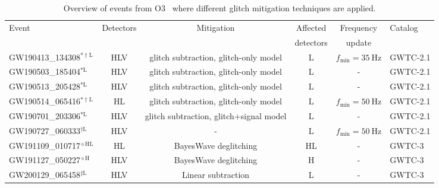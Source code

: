 \begin{table}[ht]
    \caption{
        Overview of events from O3~\citep{ligo_gwtc-21:2024, ligo_gwtc-3:2023} where different glitch mitigation techniques are applied.
    }
    \label{table:glitch_mitigation}
    \centering
    \setlength{\tabcolsep}{6pt}
    \begin{tabularx}{0.97\textwidth}{lccccl}
        \toprule
        \multirow{2}{*}{Event} & \multirow{2}{*}{Detectors} & \multirow{2}{*}{Mitigation} & Affected & Frequency & \multirow{2}{*}{Catalog} \\ 
         & & & detectors & update & \\ \midrule GW190413\_134308$^{*\dagger\mathrm{L}}$ & HLV & glitch subtraction, glitch-only model & L & $f_\mathrm{min} = \SI{35}{\hertz}$ & GWTC-2.1 \\
         GW190503\_185404$^{*\mathrm{L}}$ & HLV & glitch subtraction, glitch-only model & L & - & GWTC-2.1 \\
        GW190513\_205428$^{*\mathrm{L}}$ & HLV & glitch subtraction, glitch-only model & L & - & GWTC-2.1 \\
        GW190514\_065416$^{*\dagger\mathrm{L}}$ & HL & glitch subtraction, glitch-only model & L & $f_\mathrm{min} = \SI{50}{\hertz}$ & GWTC-2.1 \\
        GW190701\_203306$^{*\mathrm{L}}$ & HLV & glitch subtraction, glitch+signal model & L & - & GWTC-2.1 \\
        GW190727\_060333$^{\dagger\mathrm{L}}$ & HLV & - & L & $f_\mathrm{min} = \SI{50}{\hertz}$ & GWTC-2.1 \\
        GW191109\_010717$^{\diamond\mathrm{HL}}$ & HL & BayesWave deglitching & HL & - & GWTC-3\\
        GW191127\_050227$^{\diamond\mathrm{H}}$ & HLV & BayesWave deglitching & H & - & GWTC-3 \\
        GW200129\_065458$^{\ddagger\mathrm{L}}$ & HLV & Linear subtraction & L & - & GWTC-3 \\
        \bottomrule
    \end{tabularx}
\end{table}

